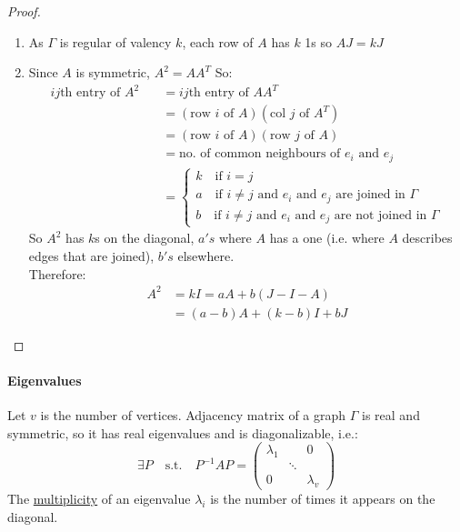 \documentclass[]{article}
\theoremstyle{definition}
\theoremstyle{remark}
\numberwithin{equation}{section}
\begin{document}
		\begin{proof}
			\begin{enumerate}
				\item As $\Gamma$ is regular of valency $k$, each row of $A$ has $k$ 1s so $AJ = kJ$
				\item Since $A$ is symmetric, $A^2 = AA^T$ So:
				\begin{align*}
				  ij\text{th entry of $A^2$}\quad
				  	&= ij\text{th entry of $AA^T$}\\
				  	&= (\text{row $i$ of $A$})(\text{col $j$ of $A^T$})\\
				  	&= (\text{row $i$ of $A$})(\text{row $j$ of $A$})\\
				  	&= \text{no. of common neighbours of $e_i$ and $e_j$}\\
				  	&= \begin{cases}
				  			k \quad \text{if $i = j$}\\
				  			a \quad \text{if $i \neq j$ and $e_i$ and $e_j$ are joined in $\Gamma$}\\
				  			b \quad \text{if $i\neq j$ and $e_i$ and $e_j$ are not joined in $\Gamma$}
				  	   \end{cases}
				\end{align*}
				So $A^2$ has $k$s on the diagonal, $a's$ where $A$ has a one (i.e. where $A$ describes edges that are joined), $b's$ elsewhere.\\
				Therefore:
				\begin{align*}
					A^2 &= kI = aA + b(J-I-A)\\
						&= (a-b)A + (k-b)I + bJ
				\end{align*}
			\end{enumerate}
		\end{proof}

		\paragraph{Eigenvalues} Let $v$ is the number of vertices. Adjacency matrix of a graph $\Gamma$ is real and symmetric, so it has real eigenvalues and is diagonalizable, i.e.:
		\[
			\exists P \quad\text{s.t.}\quad
			P^{-1}AP = \begin{pmatrix}
						\lambda_1 & & 0\\
						& \ddots & \\
						0 & & \lambda_v
						\end{pmatrix}
		\]
		The \underline{multiplicity} of an eigenvalue $\lambda_i$  is the number of times it appears on the diagonal.
\end{document}
